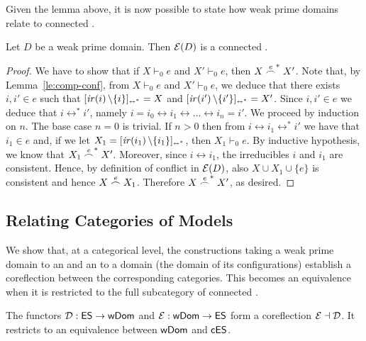 Given the lemma above, it is now possible to state how weak prime 
domains relate to connected {\esabbr}.

\begin{proposition}
  \label{pr:domain-to-fes}
  Let  $D$ be a weak prime domain. Then $\mathcal{E}({D})$ is a connected {\esabbr}.
\end{proposition}

\begin{proof}
  We have to show that
  if $X \vdash_0 e$ and $X' \vdash_0 e$, then $X \stackrel{e}{\frown}^* X'$.  Note
  that, by Lemma~\ref{le:comp-conf}, 
  from $X \vdash_0 e$ and
  $X' \vdash_0 e$, we deduce that there exists $i, i' \in e$ such that
  $[{\mathop{\mathit{ir}({i})} \setminus \{i\}}]_{\scriptscriptstyle {\leftrightarrow^*}} = X$ and
  $[{\mathop{\mathit{ir}({i'})} \setminus \{i'\}}]_{\scriptscriptstyle {\leftrightarrow^*}} = X'$. Since $i, i' \in e$ we
  deduce that $i \leftrightarrow^* i'$, namely
  $i = i_0 \leftrightarrow i_1 \leftrightarrow \ldots \leftrightarrow
  i_n = i'$. We proceed by induction on $n$. The base case $n=0$ is
  trivial. If $n >0$ then from
  $i \leftrightarrow i_1 \leftrightarrow^* i'$ we have that
  $i_1 \in e$ and, if we let
  $X_1 = [{\mathop{\mathit{ir}({i_1})} \setminus \{i_1\}}]_{\scriptscriptstyle {\leftrightarrow^*}}$, then
  $X_1 \vdash_0 e$. By inductive hypothesis, we know that
  $X_1 \stackrel{e}{\frown}^* X'$. Moreover, since $i \leftrightarrow i_1$,
  the irreducibles $i$ and $i_1$ are consistent. Hence, by definition
  of conflict in $\mathcal{E}({D})$, also $X \cup X_1 \cup \{e\}$ is consistent
  and hence $X \stackrel{e}{\frown} X_1$. Therefore $X \stackrel{e}{\frown}^* X'$, as desired.
\end{proof}



\subsection{Relating Categories of Models}
\label{ss:relating-cats}
We show that, at a categorical level, the constructions taking a weak prime domain to an
{\esabbr} and an {\esabbr} to a domain (the domain of its configurations) establish
a coreflection between the corresponding categories.
%
This becomes an equivalence when it is restricted to the full subcategory of connected {\esabbr}.

\begin{theorem}
 \label{th:es-dom-equivalence}
 The functors $\mathcal{D} : \mathsf{ES} \to \mathsf{wDom}$ and $\mathcal{E}: \mathsf{wDom} \to \mathsf{ES}$ form
 a coreflection $\mathcal{E} \dashv \mathcal{D}$.  It restricts to an equivalence between $\mathsf{wDom}$ and
 $\mathsf{cES}$.
\end{theorem}

